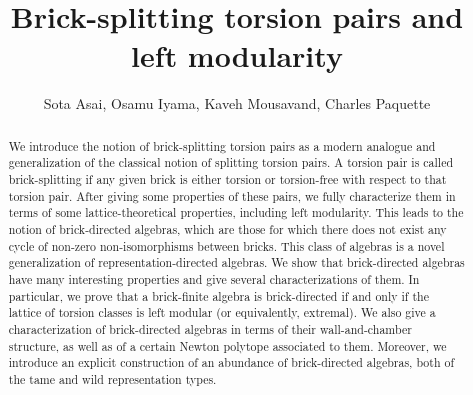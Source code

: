 \documentclass{amsart}
\theoremstyle{thmstyle}
\theoremstyle{exstyle}
\theoremstyle{defstyle}
\theoremstyle{remstyle}
\theoremstyle{remstyle}
\begin{document}
\title[Brick-splitting torsion pairs $\&$ left modularity]{Brick-splitting torsion pairs and left modularity}

\author[Sota Asai, Osamu Iyama, Kaveh Mousavand, Charles Paquette]{Sota Asai, Osamu Iyama, Kaveh Mousavand, Charles Paquette} 

\address{Sota Asai: Graduate School of Mathematical Sciences, the University of Tokyo, Japan}
\address{Osamu Iyama: Graduate School of Mathematical Sciences, the University of Tokyo, Japan}
\address{Kaveh Mousavand: Representation Theory and Algebraic Combinatorics Unit, Okinawa Institute of Science and Technology (OIST), Japan}
\address{Charles Paquette: Department of Mathematics and Computer Science, Royal Military College of Canada, Kingston ON, Canada}



\begin{abstract} 
We introduce the notion of brick-splitting torsion pairs as a modern analogue and generalization of the classical notion of splitting torsion pairs. A torsion pair is called brick-splitting if any given brick is either torsion or torsion-free with respect to that torsion pair. After giving some properties of these pairs, we fully characterize them in terms of some lattice-theoretical properties, including left modularity. This leads to the notion of brick-directed algebras, which are those for which there does not exist any cycle of non-zero non-isomorphisms between bricks. This class of algebras is a novel generalization of representation-directed algebras. We show that brick-directed algebras have many interesting properties and give several characterizations of them. In particular, we prove that a brick-finite algebra is brick-directed if and only if the lattice of torsion classes is left modular (or equivalently, extremal). We also give a characterization of brick-directed algebras in terms of their wall-and-chamber structure, as well as of a certain Newton polytope associated to them. Moreover, we introduce an explicit construction of an abundance of brick-directed algebras, both of the tame and wild representation types. 
\end{abstract}
\end{document}
